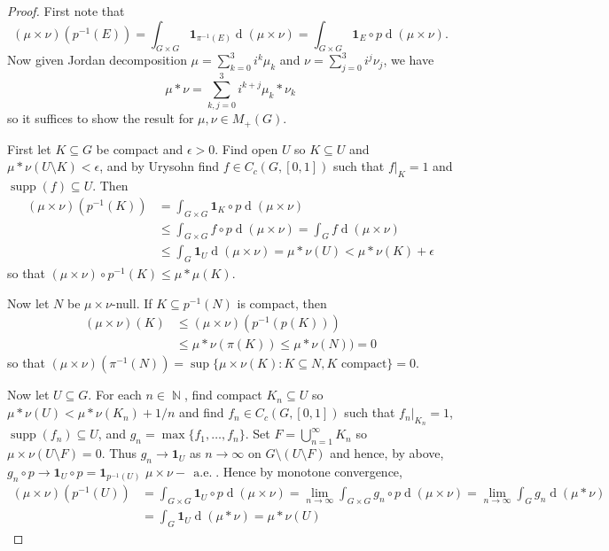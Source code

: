 \documentclass[11pt, a4paper]{memoir}
\DeclareMathOperator{\N}{{\mathbb{N}}}
\theoremstyle{change}
\theoremstyle{plain}
\theoremstyle{nonumberplain}
\newtheorem{proof}{Proof}
\DeclareMathOperator{\supp}{supp}
\renewcommand{\d}[1]{\ensuremath{\operatorname{d}\!{#1}}}
\newcommand{\mae}{\ensuremath{\,\operatorname{a.e.}}}
\newcommand{\idc}[1]{\ensuremath{\mathbf{1}_{#1}}}
\numberwithin{equation}{section}
\begin{document}
\begin{proof}
    First note that
    \begin{equation*}
        (\mu\times\nu)(p^{-1}(E))=\int_{G\times G}\idc{\pi^{-1}(E)}\d{(\mu\times\nu)}=\int_{G\times G}\idc{E}\circ p\d{(\mu\times\nu)}.
    \end{equation*}
    Now given Jordan decomposition $\mu=\sum_{k=0}^3 i^k\mu_k$ and $\nu=\sum_{j=0}^3 i^j\nu_j$, we have
    \begin{equation*}
        \mu*\nu=\sum_{k,j=0}^3i^{k+j}\mu_k*\nu_k
    \end{equation*}
    so it suffices to show the result for $\mu,\nu\in M_+(G)$.

    First let $K\subseteq G$ be compact and $\epsilon>0$.
    Find open $U$ so $K\subseteq U$ and $\mu*\nu(U\setminus K)<\epsilon$, and by Urysohn find $f\in C_c(G,[0,1])$ such that $f|_K=1$ and $\supp(f)\subseteq U$.
    Then
    \begin{align*}
        (\mu\times\nu)(p^{-1}(K)) &= \int_{G\times G}\idc{K}\circ p\d{(\mu\times\nu)}\\
                                  &\leq\int_{G\times G}f\circ p\d{(\mu\times\nu)}=\int_G f\d{(\mu\times\nu)}\\
                                  &\leq \int_G\idc{U}\d{(\mu\times\nu)}=\mu*\nu(U)<\mu*\nu(K)+\epsilon
    \end{align*}
    so that $(\mu\times\nu)\circ p^{-1}(K)\leq\mu *\mu(K)$.

    Now let $N$ be $\mu\times\nu$-null.
    If $K\subseteq p^{-1}(N)$ is compact, then
    \begin{align*}
        (\mu\times\nu)(K) &\leq(\mu\times\nu)(p^{-1}(p(K)))\\
                          &\leq \mu*\nu(\pi(K))\leq\mu*\nu(N))=0
    \end{align*}
    so that $(\mu\times\nu)(\pi^{-1}(N))=\sup\{\mu\times\nu(K):K\subseteq N,K\text{ compact}\}=0$.

    Now let $U\subseteq G$.
    For each $n\in\N$, find compact $K_n\subseteq U$ so $\mu*\nu(U)<\mu*\nu(K_n)+1/n$ and find $f_n\in C_c(G,[0,1])$ such that $f_n|_{K_n}=1$, $\supp(f_n)\subseteq U$, and $g_n=\max\{f_1,\ldots,f_n\}$.
    Set $F=\bigcup_{n=1}^\infty K_n$ so $\mu\times\nu(U\setminus F)=0$.
    Thus $g_n\to\idc{U}$ as $n\to\infty$ on $G\setminus(U\setminus F)$ and hence, by above, $g_n\circ p\to\idc{U}\circ p=\idc{p^{-1}(U)}$ $\mu\times\nu-\mae$.
    Hence by monotone convergence,
    \begin{align*}
        (\mu\times\nu)(p^{-1}(U))&=\int_{G\times G}\idc{U}\circ p\d{(\mu\times\nu)}=\lim_{n\to\infty}\int_{G\times G}g_n\circ p\d{(\mu\times\nu)}=\lim_{n\to\infty}\int_G g_n\d{(\mu*\nu)}\\
                                 &= \int_G\idc{U}\d{(\mu*\nu)}=\mu*\nu(U)
    \end{align*}


\end{proof}
\end{document}
